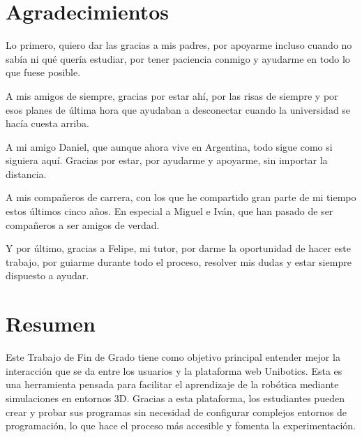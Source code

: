\documentclass[a4paper, 12pt]{book}
\begin{document}

\chapter*{Agradecimientos}

Lo primero, quiero dar las gracias a mis padres, por apoyarme incluso cuando no sabía ni qué quería estudiar, por tener paciencia conmigo y ayudarme en todo lo que fuese posible.

A mis amigos de siempre, gracias por estar ahí, por las risas de siempre y por esos planes de última hora que ayudaban a desconectar cuando la universidad se hacía cuesta arriba.

A mi amigo Daniel, que aunque ahora vive en Argentina, todo sigue como si siguiera aquí. Gracias por estar, por ayudarme y apoyarme, sin importar la distancia.

A mis compañeros de carrera, con los que he compartido gran parte de mi tiempo estos últimos cinco años. En especial a Miguel e Iván, que han pasado de ser compañeros a ser amigos de verdad.

Y por último, gracias a Felipe, mi tutor, por darme la oportunidad de hacer este trabajo, por guiarme durante todo el proceso, resolver mis dudas y estar siempre dispuesto a ayudar. 


\chapter*{Resumen}

Este Trabajo de Fin de Grado tiene como objetivo principal entender mejor la interacción que se da entre los usuarios y la plataforma web Unibotics. Esta es una herramienta pensada para facilitar el aprendizaje de la robótica mediante simulaciones en entornos 3D. Gracias a esta plataforma, los estudiantes pueden crear y probar sus programas sin necesidad de configurar complejos entornos de programación, lo que hace el proceso más accesible y fomenta la experimentación.
\end{document}
